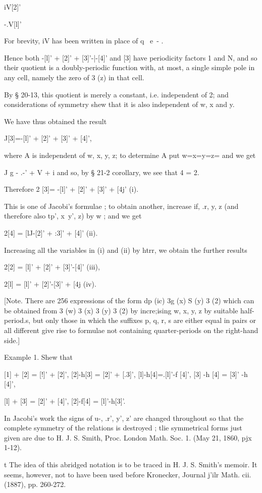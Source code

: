 iV[2]'

-.V[l]'

For brevity, iV has been written in place of q~ e~- .

Hence both -[l]' + [2]' + [3]'-|-[4]' and [3] have periodicity factors
1 and N, and so their quotient is a doubly-periodic function with, at
most, a single simple pole in any cell, namely the zero of 3 (z) in
that cell.

By § 20-13, this quotient is merely a constant, i.e. independent of 2;
and considerations of symmetry shew that it is also independent of w,
x and y.

We have thus obtained the result

J[3]=-[l]' + [2]' + [3]' + [4]',

where A is independent of w, x, y, z; to determine A put w=x=y=z= and
we get

J g - .-' + V + i and so, by § 21-2 corollary, we see that 4 = 2.

Therefore 2 [3]= -[l]' + [2]' + [3]' + [4j' (i).

This is one of Jacobi's formulae ; to obtain another, increase if, .r,
y, z (and therefore also tp', x\ y', z) by w ; and we get

2[4] = [lJ-[2]' + :3]' + [4]' (ii).

Increasing all the variables in (i) and (ii) by htrr, we obtain the
further results

2[2] = [l]' + [2]' + [3]'-[4]' (iii),

2[l] = [l]' + [2]'-[3]' + [4j (iv).

[Note. There are 256 expressions of the form dp (ic) 3g (x) S (y) 3
(2) which can be obtained from 3 (w) 3 (x) 3 (y) 3 (2) by incre;ising
w, x, y, z by suitable half-period.s, but only those in which the
suffixes p, q, r, s are either equal in pairs or all different give
rise to formulae not containing quarter-periods on the right-hand
side.]

Example 1. Shew that

[1] + [2] = [!]' + [2]', [2]-h[3] = [2]' + [.3]', [l]-h[4]=.[l]'-f
[4]', [3] -h [4] = [3]' -h [4]',

[l] + [3] = [2]' + [4]', [2]-f[4] = [l]'-h[3]'.

In Jacobi's work the signs of u-, .r', y', z' are changed throughout
so that the complete symmetry of the relations is destroyed ; tlie
symmetrical forms just given are due to H. J. S. Smith, Proc. London
Math. Soc. 1. (May 21, 1860, pjx 1-12).

t The idea of this abridged notation is to be traced in H. J. S.
Smith's memoir. It seems, however, not to have been used before
Kronecker, Journal j'ilr Math. cii. (1887), pp. 260-272.

